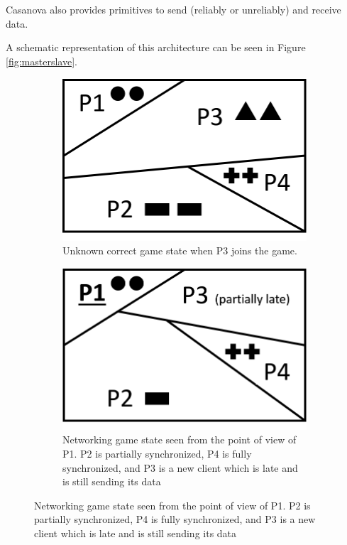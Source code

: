 Casanova also provides primitives to send (reliably or unreliably) and receive data.

A schematic representation of this architecture can be seen in Figure \ref{fig:masterslave}.

\begin{figure}[h!]
	\centering
	\caption{Representation of the game world in a networking scenario}
	\label{fig:network_world}
	\begin{subfigure}[t]{0.3\linewidth}
		\centering
		\includegraphics[width=1\linewidth]{Figures/networking2}
		\caption{Unknown correct game state when P3 joins the game.\\}
		\label{subfig:networking_ideal}
	\end{subfigure}
	\begin{subfigure}[t]{0.3\linewidth}
		\centering
		\includegraphics[width=1\linewidth]{Figures/networking1}
		\caption{Networking game state seen from the point of view of P1. P2 is partially synchronized, P4 is fully synchronized, and P3 is a new client which is late and is still sending its data}
		\label{subfig:networking_relative}
	\end{subfigure}
	

\end{figure}


